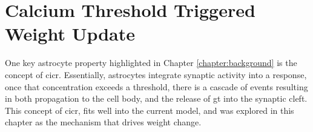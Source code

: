 

\section{Calcium Threshold Triggered Weight Update}
One key astrocyte property highlighted in Chapter \ref{chapter:background} is
the concept of \gls{cicr}. Essentially, astrocytes integrate synaptic activity into a
\ca response, once that \ca concentration exceeds a threshold, there is a
cascade of events resulting in both \ca propagation to the cell body, and the
release of \gls{gt} into the synaptic cleft. This concept of \gls{cicr}, fits
well into the current model, and was explored in this chapter as the
mechanism that drives weight change.


